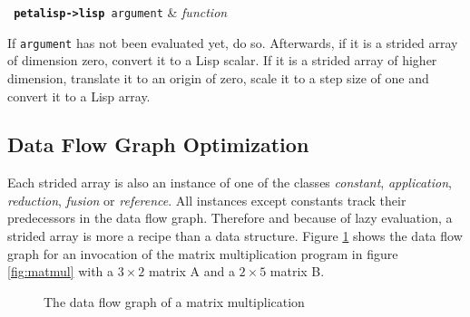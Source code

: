 \begin{function}
  \texttt{ \textbf{petalisp->lisp} argument} & \textsl{function} \\
\end{function}

If \texttt{argument} has not been evaluated yet, do so. Afterwards, if it
is a strided array of dimension zero, convert it to a Lisp scalar. If it is
a strided array of higher dimension, translate it to an origin of zero,
scale it to a step size of one and convert it to a Lisp array.

\subsection{Data Flow Graph Optimization}

Each strided array is also an instance of one of the classes
\emph{constant}, \emph{application}, \emph{reduction}, \emph{fusion} or
\emph{reference}. All instances except constants track their predecessors
in the data flow graph. Therefore and because of lazy evaluation, a strided
array is more a recipe than a data structure. Figure \ref{fig:matmul-graph}
shows the data flow graph for an invocation of the matrix multiplication
program in figure \ref{fig:matmul} with a $3\times 2$ matrix A and a
$2 \times 5$ matrix B.

\begin{figure}[htb]
\begin{center}
\end{center}
\caption{The data flow graph of a matrix multiplication}
\label{fig:matmul-graph}
\end{figure}

